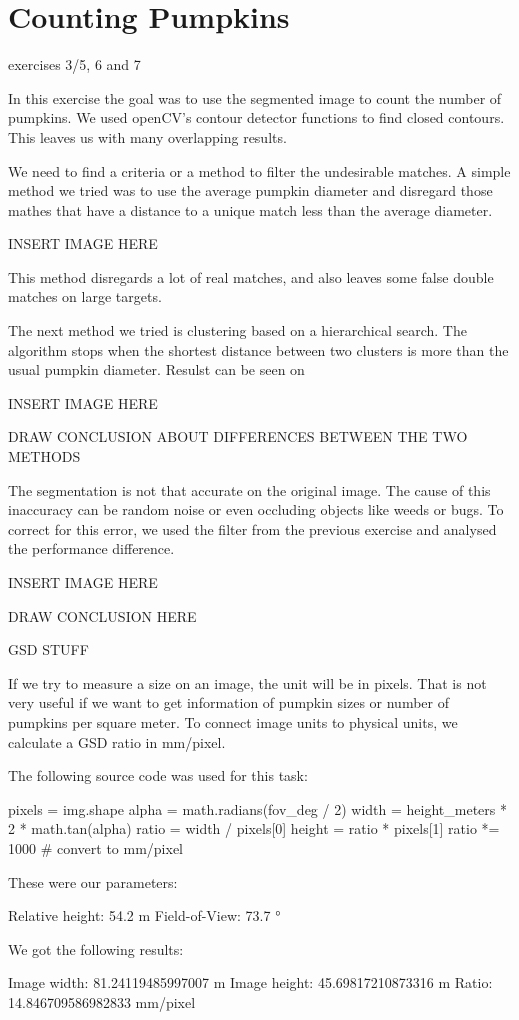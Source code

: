 \documentclass[../Head/Main.tex]{subfiles}
\begin{document}
\section{Counting Pumpkins}
exercises 3/5, 6 and 7

In this exercise the goal was to use the segmented image to count the number of pumpkins. We used openCV's contour detector functions to find closed contours. This leaves us with many overlapping results.

We need to find a criteria or a method to filter the undesirable matches. A simple method we tried was to use the average pumpkin diameter and disregard those mathes that have a distance to a unique match less than the average diameter.

INSERT IMAGE HERE

This method disregards a lot of real matches, and also leaves some false double matches on large targets.

The next method we tried is clustering based on a hierarchical search. The algorithm stops when the shortest distance between two clusters is more than the usual pumpkin diameter. Resulst can be seen on

INSERT IMAGE HERE

DRAW CONCLUSION ABOUT DIFFERENCES BETWEEN THE TWO METHODS

The segmentation is not that accurate on the original image. The cause of this inaccuracy can be random noise or even occluding objects like weeds or bugs. To correct for this error, we used the filter from the previous exercise and analysed the performance difference.

INSERT IMAGE HERE

DRAW CONCLUSION HERE

GSD STUFF

If we try to measure a size on an image, the unit will be in pixels. That is not very useful if we want to get information of pumpkin sizes or number of pumpkins per square meter. To connect image units to physical units, we calculate a GSD ratio in mm/pixel.

The following source code was used for this task:

pixels = img.shape
alpha = math.radians(fov_deg / 2)
width = height_meters * 2 * math.tan(alpha)
ratio = width / pixels[0]
height = ratio * pixels[1]
ratio *= 1000 # convert to mm/pixel


These were our parameters:

Relative height: 54.2 m
Field-of-View: 73.7 °


We got the following results:

Image width: 81.24119485997007 m
Image height: 45.69817210873316 m
Ratio: 14.846709586982833 mm/pixel
\end{document}
